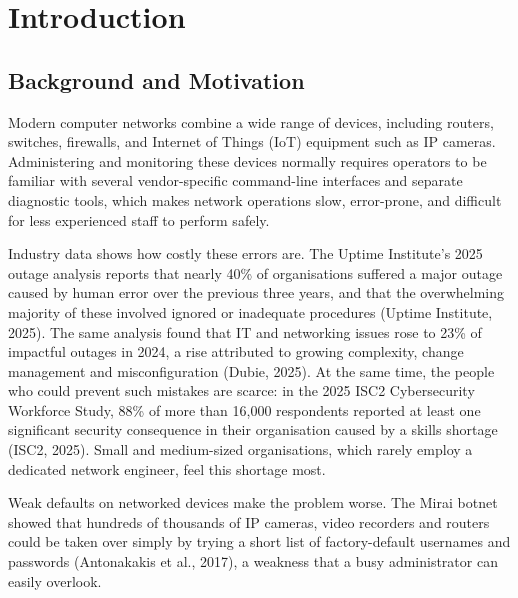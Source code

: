 \chapter{Introduction}

\section{Background and Motivation}

Modern computer networks combine a wide range of devices, including routers,
switches, firewalls, and Internet of Things (IoT) equipment such as IP
cameras. Administering and monitoring these devices normally requires
operators to be familiar with several vendor-specific command-line
interfaces and separate diagnostic tools, which makes network operations
slow, error-prone, and difficult for less experienced staff to perform
safely.

Industry data shows how costly these errors are. The Uptime Institute's 2025
outage analysis reports that nearly 40\% of organisations suffered a major
outage caused by human error over the previous three years, and that the
overwhelming majority of these involved ignored or inadequate procedures
(Uptime Institute, 2025). The same analysis found that IT and networking
issues rose to 23\% of impactful outages in 2024, a rise attributed to
growing complexity, change management and misconfiguration (Dubie, 2025).
At the same time, the people who could prevent such mistakes are scarce:
in the 2025 ISC2 Cybersecurity Workforce Study, 88\% of more than 16,000
respondents reported at least one significant security consequence in their
organisation caused by a skills shortage (ISC2, 2025). Small and
medium-sized organisations, which rarely employ a dedicated network
engineer, feel this shortage most.

Weak defaults on networked devices make the problem worse. The Mirai botnet
showed that hundreds of thousands of IP cameras, video recorders and routers
could be taken over simply by trying a short list of factory-default
usernames and passwords (Antonakakis et al., 2017), a weakness that a busy
administrator can easily overlook.

